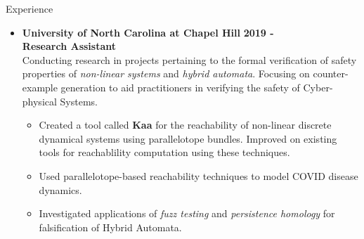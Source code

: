 \documentclass{resume} %
\begin{document}
\begin{rSection}{Experience}
  \begin{itemize}[leftmargin=*]
    \item
      {\bf University of North Carolina at Chapel Hill} \hfill {\bf 2019 -} \\
      {\bf Research Assistant} \\
      Conducting research in projects pertaining to the formal verification of safety properties of \emph{non-linear systems} and \emph{hybrid automata}. Focusing on counter-example generation to aid practitioners in verifying the safety of Cyber-physical Systems.
        \begin{itemize}[label=$\blackdiamond$]
            \item Created a tool called {\bf Kaa} for the reachability of non-linear discrete dynamical systems using parallelotope bundles. Improved on existing tools for reachablility computation using these techniques.
            \item Used parallelotope-based reachability techniques to model COVID disease dynamics.
            \item Investigated applications of \emph{fuzz testing} and \emph{persistence homology} for falsification of Hybrid Automata.
        \end{itemize}
  \end{itemize}


\end{rSection}

\newpage
\end{document}
